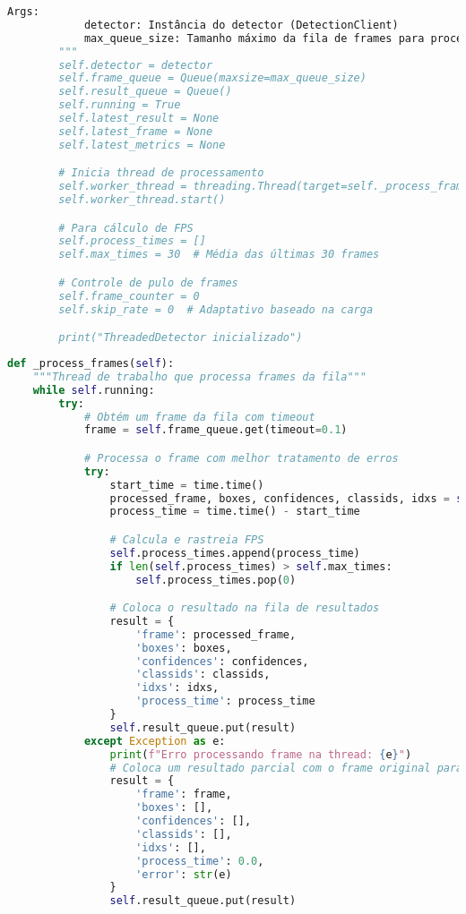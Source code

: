 \documentclass[
	12pt,				%
	oneside, %
	a4paper,			%
	english,			%
	french,				%
	spanish,			%
	brazil				%
	]{abntex2}
\begin{document}
\begin{apendicesenv}
\begin{lstlisting}[language=Python, caption=Implementação de detector assíncrono com \textit{threads}., label=lst:threaded_detector]
        Args:
            detector: Instância do detector (DetectionClient)
            max_queue_size: Tamanho máximo da fila de frames para processamento
        """
        self.detector = detector
        self.frame_queue = Queue(maxsize=max_queue_size)
        self.result_queue = Queue()
        self.running = True
        self.latest_result = None
        self.latest_frame = None
        self.latest_metrics = None

        # Inicia thread de processamento
        self.worker_thread = threading.Thread(target=self._process_frames, daemon=True)
        self.worker_thread.start()

        # Para cálculo de FPS
        self.process_times = []
        self.max_times = 30  # Média das últimas 30 frames

        # Controle de pulo de frames
        self.frame_counter = 0
        self.skip_rate = 0  # Adaptativo baseado na carga

        print("ThreadedDetector inicializado")
\end{lstlisting}

\begin{lstlisting}[language=Python, caption=Método de processamento assíncrono de \textit{frames}., label=lst:process_frames]
def _process_frames(self):
    """Thread de trabalho que processa frames da fila"""
    while self.running:
        try:
            # Obtém um frame da fila com timeout
            frame = self.frame_queue.get(timeout=0.1)

            # Processa o frame com melhor tratamento de erros
            try:
                start_time = time.time()
                processed_frame, boxes, confidences, classids, idxs = self.detector.detect_objects(frame)
                process_time = time.time() - start_time

                # Calcula e rastreia FPS
                self.process_times.append(process_time)
                if len(self.process_times) > self.max_times:
                    self.process_times.pop(0)

                # Coloca o resultado na fila de resultados
                result = {
                    'frame': processed_frame,
                    'boxes': boxes,
                    'confidences': confidences,
                    'classids': classids,
                    'idxs': idxs,
                    'process_time': process_time
                }
                self.result_queue.put(result)
            except Exception as e:
                print(f"Erro processando frame na thread: {e}")
                # Coloca um resultado parcial com o frame original para evitar bloqueio
                result = {
                    'frame': frame,
                    'boxes': [],
                    'confidences': [],
                    'classids': [],
                    'idxs': [],
                    'process_time': 0.0,
                    'error': str(e)
                }
                self.result_queue.put(result)


\end{lstlisting}
\end{apendicesenv}
\end{document}
